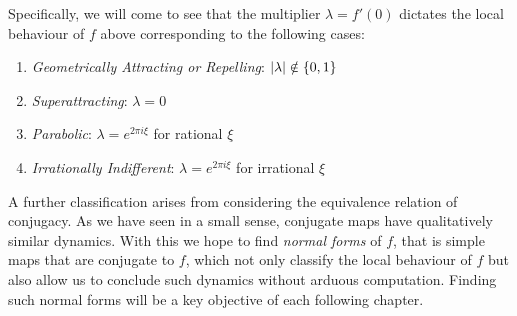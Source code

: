 \documentclass[../main.tex]{subfiles}
\begin{document}
Specifically, we will come to see that the multiplier $\lambda=f'(0)$ dictates the local behaviour of $f$ above corresponding to the following cases:
\begin{enumerate}
    \item \emph{Geometrically Attracting or Repelling}:
    $\left|\lambda\right|\notin \{0, 1\}$
    \item \emph{Superattracting}: $\lambda = 0$
    \item \emph{Parabolic}: $\lambda=e^{2\pi i\xi}$ for rational $\xi$
    \item \emph{Irrationally Indifferent}: $\lambda=e^{2\pi i\xi}$ for irrational $\xi$
\end{enumerate}
    
A further classification arises from considering the equivalence relation of conjugacy. As we have seen in a small sense, conjugate maps have qualitatively similar dynamics. With this we hope to find \emph{normal forms} of $f$, that is simple maps that are conjugate to $f$, which not only classify the local behaviour of $f$ but also allow us to conclude such dynamics without arduous computation. Finding such normal forms will be a key objective of each following chapter.
\end{document}
